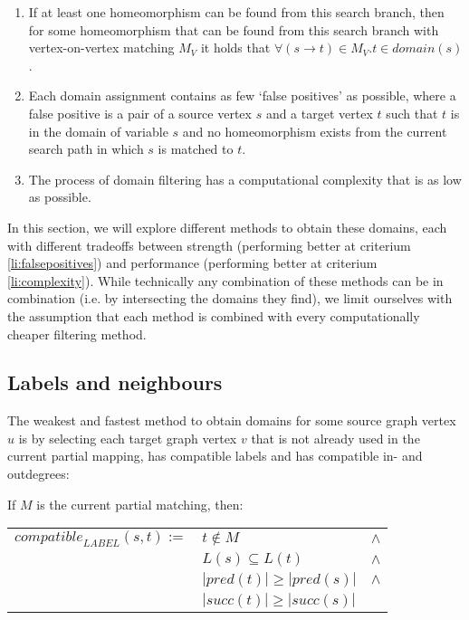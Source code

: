 \begin{enumerate}
\item \label{li:complete}If at least one homeomorphism can be found from this search branch, then for some homeomorphism that can be found from this search branch with vertex-on-vertex matching $M_V$ it holds that $\forall (s \to t) \in M_V . t \in \mathit{domain}(s)$.
\item \label{li:falsepositives}Each domain assignment contains as few `false positives' as possible, where a false positive is a pair of a source vertex $s$ and a target vertex $t$ such that $t$ is in the domain of variable $s$ and no homeomorphism exists from the current search path in which $s$ is matched to $t$.
\item \label{li:complexity} The process of domain filtering has a computational complexity that is as low as possible.
\end{enumerate}

In this section, we will explore different methods to obtain these domains, each with different tradeoffs between strength (performing better at criterium \ref{li:falsepositives}) and performance (performing better at criterium \ref{li:complexity}). While technically any combination of these methods can be in combination (i.e. by intersecting the domains they find), we limit ourselves with the assumption that each method is combined with every computationally cheaper filtering method.
\subsection{Labels and neighbours}
The weakest and fastest method to obtain domains for some source graph vertex $u$ is by selecting each target graph vertex $v$ that is not already used in the current partial mapping, has compatible labels and has compatible in- and outdegrees:

\begin{minipage}{\textwidth}
\begin{defn} If $M$ is the current partial matching, then:

\begin{center}
\bgroup
\def\arraystretch{1.2}
\setlength\tabcolsep{5pt}
\begin{tabular}{lll}
\centering
$\mathit{compatible}_{\mathit{LABEL}}(s,t) := $&$t \not \in M$&$\land$\\
&$L(s) \subseteq L(t)$&$\land$\\
&$|\mathit{pred}(t)| \geq |\mathit{pred}(s)|$&$\land$\\
&$|\mathit{succ}(t)| \geq |\mathit{succ}(s)|$&\\
\end{tabular}
\egroup
\end{center}

\end{defn}
\end{minipage}

